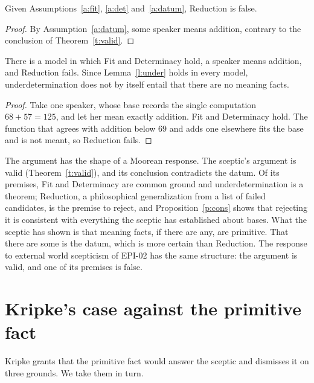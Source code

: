 \documentclass{situationist-preprint}
\begin{document}
\begin{theorem}\label{t:main}
Given Assumptions~\ref{a:fit}, \ref{a:det} and~\ref{a:datum}, Reduction is false.
\end{theorem}

\begin{proof}
By Assumption~\ref{a:datum}, some speaker means addition, contrary to the conclusion of Theorem~\ref{t:valid}.
\end{proof}

\begin{proposition}[Consistency]\label{p:cons}
There is a model in which Fit and Determinacy hold, a speaker means addition, and Reduction fails. Since Lemma~\ref{l:under} holds in every model, underdetermination does not by itself entail that there are no meaning facts.
\end{proposition}

\begin{proof}
Take one speaker, whose base records the single computation $68 + 57 = 125$, and let her mean exactly addition. Fit and Determinacy hold. The function that agrees with addition below 69 and adds one elsewhere fits the base and is not meant, so Reduction fails.
\end{proof}

The argument has the shape of a Moorean response. The sceptic's argument is valid (Theorem~\ref{t:valid}), and its conclusion contradicts the datum. Of its premises, Fit and Determinacy are common ground and underdetermination is a theorem; Reduction, a philosophical generalization from a list of failed candidates, is the premise to reject, and Proposition~\ref{p:cons} shows that rejecting it is consistent with everything the sceptic has established about bases. What the sceptic has shown is that meaning facts, if there are any, are primitive. That there are some is the datum, which is more certain than Reduction. The response to external world scepticism of EPI-02 has the same structure: the argument is valid, and one of its premises is false.

\section{Kripke's case against the primitive fact}

Kripke grants that the primitive fact would answer the sceptic and dismisses it on three grounds. We take them in turn.
\end{document}

